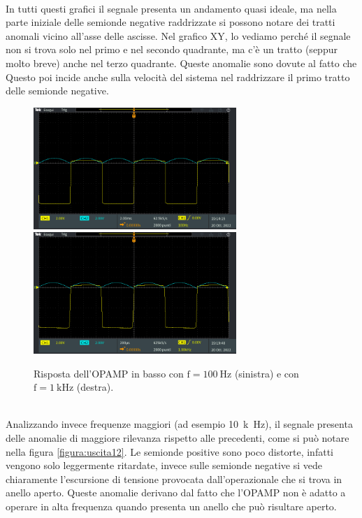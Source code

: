 \documentclass{report}
\begin{document}
\\In tutti questi grafici il segnale presenta un andamento quasi ideale, ma nella parte iniziale delle semionde negative raddrizzate si possono notare dei tratti anomali vicino all'asse delle ascisse. Nel grafico XY, lo vediamo perché il segnale non si trova solo nel primo e nel secondo quadrante, ma c'è un tratto (seppur molto breve) anche nel terzo quadrante. Queste anomalie sono dovute al fatto che  Questo poi incide anche sulla velocità del sistema nel raddrizzare il primo tratto delle semionde negative.
\begin{figure}[h!]
	\centering
	\includegraphics[height=4.6cm]{immagini/TEK00002}
	\includegraphics[height=4.6cm]{immagini/TEK00004}
	\caption{Risposta dell'OPAMP in basso con $\mathrm{f= \SI{100}{\hertz}}$ (sinistra) e con $\mathrm{f= \SI{1}{k\hertz}}$ (destra).}
	\label{figura:uscita111}
\end{figure}
\\Analizzando invece frequenze maggiori (ad esempio \SI{10}{k\hertz}), il segnale presenta delle anomalie di maggiore rilevanza rispetto alle precedenti, come si può notare nella figura \ref{figura:uscita12}. Le semionde positive sono poco distorte, infatti vengono solo leggermente ritardate, invece sulle semionde negative si vede chiaramente l'escursione di tensione provocata dall'operazionale che si trova in anello aperto. Queste anomalie derivano dal fatto che l'OPAMP non è adatto a operare in alta frequenza quando presenta un anello che può risultare aperto.
\end{document}
